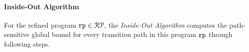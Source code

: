 %
\paragraph*{Inside-Out Algorithm}
For the refined program $\mathtt{rp} \in \mathcal{RP}$, the \emph{Inside-Out Algorithm}
computes the path-sensitive global bound for every transition path in this program $\mathtt{rp}$ through following steps.

